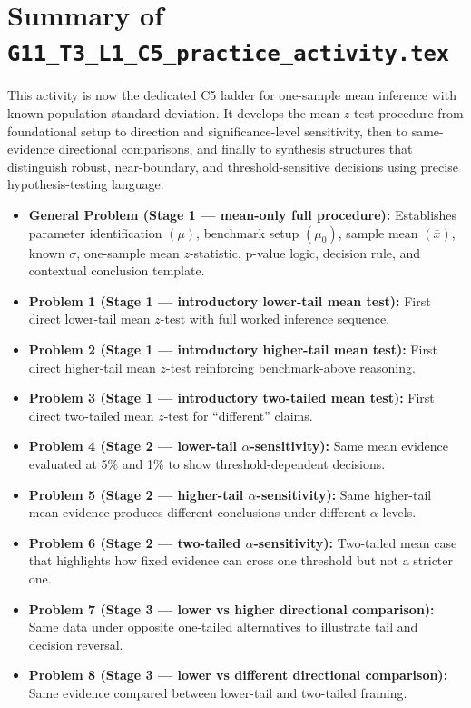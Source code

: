 \section{Summary of \texttt{G11\_T3\_L1\_C5\_practice\_activity.tex}}
This activity is now the dedicated C5 ladder for one-sample mean inference with known population standard deviation. It develops the mean \(z\)-test procedure from foundational setup to direction and significance-level sensitivity, then to same-evidence directional comparisons, and finally to synthesis structures that distinguish robust, near-boundary, and threshold-sensitive decisions using precise hypothesis-testing language.

\begin{itemize}
    \item \textbf{General Problem (Stage 1 --- mean-only full procedure):} Establishes parameter identification \((\mu)\), benchmark setup \((\mu_0)\), sample mean \((\bar x)\), known \(\sigma\), one-sample mean \(z\)-statistic, p-value logic, decision rule, and contextual conclusion template.
    \item \textbf{Problem 1 (Stage 1 --- introductory lower-tail mean test):} First direct lower-tail mean \(z\)-test with full worked inference sequence.
    \item \textbf{Problem 2 (Stage 1 --- introductory higher-tail mean test):} First direct higher-tail mean \(z\)-test reinforcing benchmark-above reasoning.
    \item \textbf{Problem 3 (Stage 1 --- introductory two-tailed mean test):} First direct two-tailed mean \(z\)-test for ``different'' claims.
    \item \textbf{Problem 4 (Stage 2 --- lower-tail \(\alpha\)-sensitivity):} Same mean evidence evaluated at 5\% and 1\% to show threshold-dependent decisions.
    \item \textbf{Problem 5 (Stage 2 --- higher-tail \(\alpha\)-sensitivity):} Same higher-tail mean evidence produces different conclusions under different \(\alpha\) levels.
    \item \textbf{Problem 6 (Stage 2 --- two-tailed \(\alpha\)-sensitivity):} Two-tailed mean case that highlights how fixed evidence can cross one threshold but not a stricter one.
    \item \textbf{Problem 7 (Stage 3 --- lower vs higher directional comparison):} Same data under opposite one-tailed alternatives to illustrate tail and decision reversal.
    \item \textbf{Problem 8 (Stage 3 --- lower vs different directional comparison):} Same evidence compared between lower-tail and two-tailed framing.

\end{itemize}

